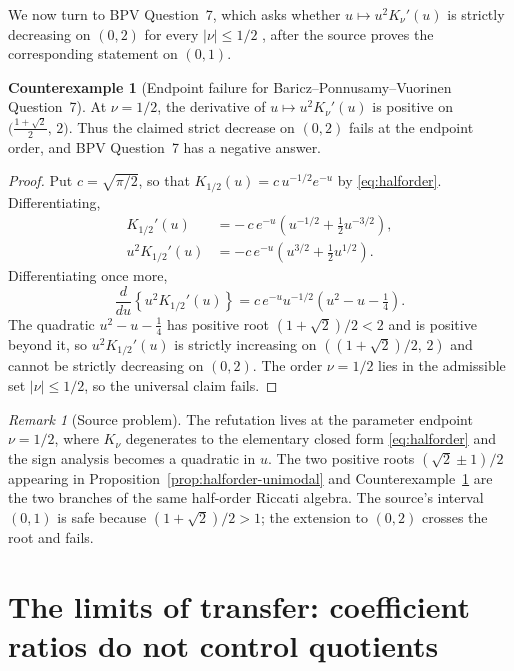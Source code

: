 \documentclass[preprint,12pt]{elsarticle}
\theoremstyle{plain}
\theoremstyle{definition}
\newtheorem{counterexample}[theorem]{Counterexample}
\theoremstyle{remark}
\newtheorem{remark}[theorem]{Remark}
\begin{document}
We now turn to BPV Question~7, which asks whether
\(u\mapsto u^2K_\nu'(u)\) is strictly decreasing on \((0,2)\) for every
\(|\nu|\le1/2\) \cite[Question~7]{bpv}, after the source proves the corresponding statement on
\((0,1)\).

\begin{counterexample}[Endpoint failure for Baricz--Ponnusamy--Vuorinen Question~7]
\label{cx:question7}
At \(\nu=1/2\), the derivative of \(u\mapsto u^2K_\nu'(u)\) is positive on
\(\bigl(\tfrac{1+\sqrt2}{2},\,2\bigr)\). Thus the claimed strict decrease on
\((0,2)\) fails at the endpoint order, and BPV Question~7
\cite[Question~7]{bpv} has a negative answer.
\end{counterexample}
\begin{proof}
Put \(c=\sqrt{\pi/2}\), so that \(K_{1/2}(u)=c\,u^{-1/2}e^{-u}\) by
\eqref{eq:halforder}. Differentiating,
\begin{equation}
\begin{aligned}
K_{1/2}'(u)
&=-\,c\,e^{-u}\left(u^{-1/2}+\tfrac12u^{-3/2}\right),\\
u^2K_{1/2}'(u)
&=-c\,e^{-u}\left(u^{3/2}+\tfrac12u^{1/2}\right).
\end{aligned}
\end{equation}
Differentiating once more,
\begin{equation}
\frac{d}{du}\left\{u^2K_{1/2}'(u)\right\}
=c\,e^{-u}u^{-1/2}\left(u^2-u-\tfrac14\right).
\end{equation}
The quadratic \(u^2-u-\tfrac14\) has positive root \((1+\sqrt2)/2<2\) and is
positive beyond it, so \(u^2K_{1/2}'(u)\) is strictly increasing on
\(((1+\sqrt2)/2,\,2)\) and cannot be strictly decreasing on \((0,2)\). The
order \(\nu=1/2\) lies in the admissible set \(|\nu|\le1/2\), so the
universal claim fails.
\end{proof}

\begin{remark}[Source problem]
The refutation lives at the parameter endpoint \(\nu=1/2\), where \(K_\nu\)
degenerates to the elementary closed form \eqref{eq:halforder} and the sign
analysis becomes a quadratic in \(u\). The two positive roots
\((\sqrt2\pm1)/2\) appearing in Proposition~\ref{prop:halforder-unimodal}
and Counterexample~\ref{cx:question7} are the two branches of the same
half-order Riccati algebra. The source's interval \((0,1)\) is safe because
\((1+\sqrt2)/2>1\); the extension to \((0,2)\) crosses the root and fails.
\end{remark}

\section{The limits of transfer: coefficient ratios do not control quotients}
\label{sec:transfer}
\end{document}
